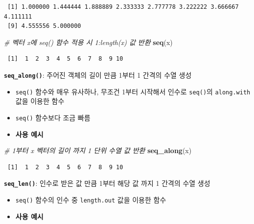 \documentclass[
  11pt,
]{krantz}
\newenvironment{Shaded}{\begin{snugshade}}{\end{snugshade}}
\newcommand{\CommentTok}[1]{\textcolor[rgb]{0.37,0.37,0.37}{\textit{#1}}}
\newcommand{\KeywordTok}[1]{\textcolor[rgb]{0.27,0.27,0.27}{\textbf{#1}}}
\newcommand{\NormalTok}[1]{#1}
\providecommand{\tightlist}{%
  \setlength{\itemsep}{0pt}\setlength{\parskip}{0pt}}
\begin{document}
\begin{verbatim}
 [1] 1.000000 1.444444 1.888889 2.333333 2.777778 3.222222 3.666667 4.111111
 [9] 4.555556 5.000000
\end{verbatim}

\begin{Shaded}
\begin{Highlighting}[]
\CommentTok{# 벡터 x에 seq() 함수 적용 시 1:length(x) 값 반환}
\KeywordTok{seq}\NormalTok{(x)}
\end{Highlighting}
\end{Shaded}

\begin{verbatim}
 [1]  1  2  3  4  5  6  7  8  9 10
\end{verbatim}

\normalsize

\textbf{\texttt{seq\_along()}}: 주어진 객체의 길이 만큼 1부터 1 간격의 수열 생성

\begin{itemize}
\tightlist
\item
  \texttt{seq()} 함수와 매우 유사하나, 무조건 1부터 시작해서 인수로 \texttt{seq()}의 \texttt{along.with} 값을 이용한 함수
\item
  \texttt{seq()} 함수보다 조금 빠름
\item
  \textbf{사용 예시}
\end{itemize}

\footnotesize

\begin{Shaded}
\begin{Highlighting}[]
\CommentTok{# 1부터 x 벡터의 길이 까지 1 단위 수열 값 반환}
\KeywordTok{seq_along}\NormalTok{(x)}
\end{Highlighting}
\end{Shaded}

\begin{verbatim}
 [1]  1  2  3  4  5  6  7  8  9 10
\end{verbatim}

\normalsize

\textbf{\texttt{seq\_len()}}: 인수로 받은 값 만큼 1부터 해당 값 까지 1 간격의 수열 생성

\begin{itemize}
\tightlist
\item
  \texttt{seq()} 함수의 인수 중 \texttt{length.out} 값을 이용한 함수
\item
  \textbf{사용 예시}
\end{itemize}

\footnotesize
\end{document}
